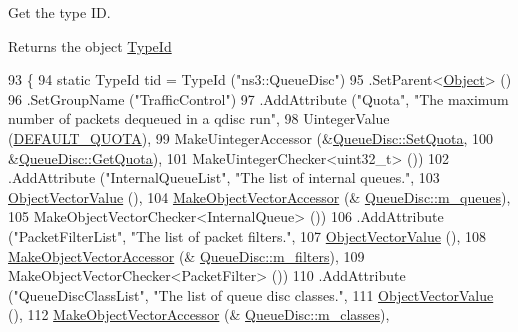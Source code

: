 Get the type ID. 

\begin{DoxyReturn}{Returns}
the object \hyperlink{classns3_1_1TypeId}{Type\+Id} 
\end{DoxyReturn}

\begin{DoxyCode}
93 \{
94   \textcolor{keyword}{static} TypeId tid = TypeId (\textcolor{stringliteral}{"ns3::QueueDisc"})
95     .SetParent<\hyperlink{classns3_1_1Object_a40860402e64d8008fb42329df7097cdb}{Object}> ()
96     .SetGroupName (\textcolor{stringliteral}{"TrafficControl"})
97     .AddAttribute (\textcolor{stringliteral}{"Quota"}, \textcolor{stringliteral}{"The maximum number of packets dequeued in a qdisc run"},
98                    UintegerValue (\hyperlink{classns3_1_1QueueDisc_a057a2c6dd982ffb206ce2a42eb4f46fa}{DEFAULT\_QUOTA}),
99                    MakeUintegerAccessor (&\hyperlink{classns3_1_1QueueDisc_ab35519e5f10b3226c4b2a07e009bcc20}{QueueDisc::SetQuota},
100                                          &\hyperlink{classns3_1_1QueueDisc_a1d058b896f93e346227a59c49085626e}{QueueDisc::GetQuota}),
101                    MakeUintegerChecker<uint32\_t> ())
102     .AddAttribute (\textcolor{stringliteral}{"InternalQueueList"}, \textcolor{stringliteral}{"The list of internal queues."},
103                    \hyperlink{namespacens3_a5de726d8bcea7a51fd68ce5167a66713}{ObjectVectorValue} (),
104                    \hyperlink{namespacens3_a6ad5b3621a5dc72b7030cbb07c73adf6}{MakeObjectVectorAccessor} (&
      \hyperlink{classns3_1_1QueueDisc_ae6507c7002e15afd8944a34f239331d7}{QueueDisc::m\_queues}),
105                    MakeObjectVectorChecker<InternalQueue> ())
106     .AddAttribute (\textcolor{stringliteral}{"PacketFilterList"}, \textcolor{stringliteral}{"The list of packet filters."},
107                    \hyperlink{namespacens3_a5de726d8bcea7a51fd68ce5167a66713}{ObjectVectorValue} (),
108                    \hyperlink{namespacens3_a6ad5b3621a5dc72b7030cbb07c73adf6}{MakeObjectVectorAccessor} (&
      \hyperlink{classns3_1_1QueueDisc_a04bc2a1d90315527c6ba411eb2cb722a}{QueueDisc::m\_filters}),
109                    MakeObjectVectorChecker<PacketFilter> ())
110     .AddAttribute (\textcolor{stringliteral}{"QueueDiscClassList"}, \textcolor{stringliteral}{"The list of queue disc classes."},
111                    \hyperlink{namespacens3_a5de726d8bcea7a51fd68ce5167a66713}{ObjectVectorValue} (),
112                    \hyperlink{namespacens3_a6ad5b3621a5dc72b7030cbb07c73adf6}{MakeObjectVectorAccessor} (&
      \hyperlink{classns3_1_1QueueDisc_a054d624a7a6f10a11cffec1f858feb3c}{QueueDisc::m\_classes}),

\end{DoxyCode}
